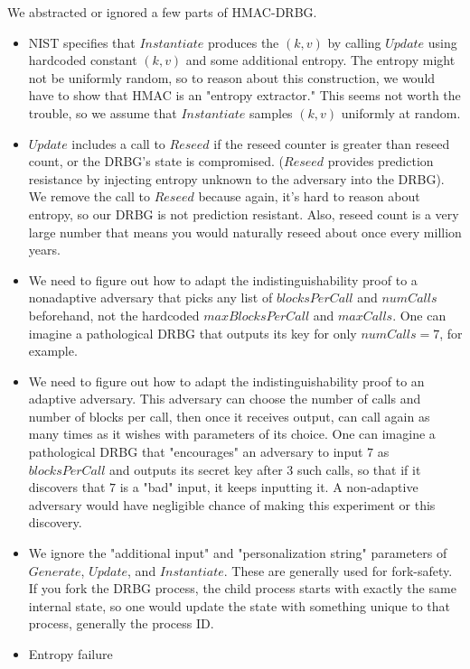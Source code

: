 \documentclass[12pt,lot, lof]{puthesis}
\newcommand{\kv} {$(k, v)$ }
\begin{document}
{We abstracted or ignored a few parts of HMAC-DRBG.

\begin{itemize}
\item NIST specifies that $Instantiate$ produces the \kv  by calling $Update$ using hardcoded constant \kv and some additional entropy. The entropy might not be uniformly random, so to reason about this construction, we would have to show that HMAC is an "entropy extractor." This seems not worth the trouble, so we assume that $Instantiate$ samples \kv uniformly at random. %
\item $Update$ includes a call to $Reseed$ if the reseed counter is greater than reseed count, or the DRBG's state is compromised. ($Reseed$ provides prediction resistance by injecting entropy unknown to the adversary into the DRBG). We remove the call to $Reseed$ because again, it's hard to reason about entropy, so our DRBG is not prediction resistant. Also, reseed count is a very large number that means you would naturally reseed about once every million years.
\item We need to figure out how to adapt the indistinguishability proof to a nonadaptive adversary that picks any list of $blocksPerCall$ and $numCalls$ beforehand, not the hardcoded $maxBlocksPerCall$ and $maxCalls$. One can imagine a pathological DRBG that outputs its key for only $numCalls = 7$, for example.
\item We need to figure out how to adapt the indistinguishability proof to an adaptive adversary. This adversary can choose the number of calls and number of blocks per call, then once it receives output, can call again as many times as it wishes with parameters of its choice. One can imagine a pathological DRBG that "encourages" an adversary to input $7$ as $blocksPerCall$ and outputs its secret key after 3 such calls, so that if it discovers that $7$ is a "bad" input, it keeps inputting it. A non-adaptive adversary would have negligible chance of making this experiment or this discovery.
\item We ignore the "additional input" and "personalization string" parameters of $Generate$, $Update$, and $Instantiate$. These are generally used for fork-safety. If you fork the DRBG process, the child process starts with exactly the same internal state, so one would update the state with something unique to that process, generally the process ID.
\item Entropy failure
\end{itemize}

}
\end{document}
